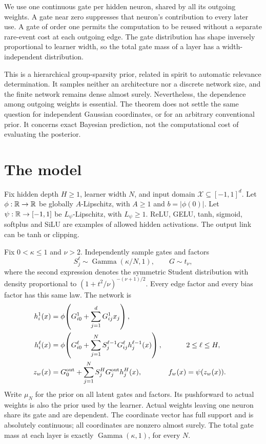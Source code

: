 \documentclass[11pt]{article}
\theoremstyle{remark}\newtheorem{remark}[theorem]{Remark}
\begin{document}
We use one continuous gate per hidden neuron, shared by all its outgoing weights. A gate near zero suppresses that neuron's contribution to every later use. A gate of order one permits the computation to be reused without a separate rare-event cost at each outgoing edge. The gate distribution has shape inversely proportional to learner width, so the total gate mass of a layer has a width-independent distribution.

This is a hierarchical group-sparsity prior, related in spirit to automatic relevance determination. It samples neither an architecture nor a discrete network size, and the finite network remains dense almost surely. Nevertheless, the dependence among outgoing weights is essential. The theorem does not settle the same question for independent Gaussian coordinates, or for an arbitrary conventional prior. It concerns exact Bayesian prediction, not the computational cost of evaluating the posterior.

\section{The model}
Fix hidden depth $H\ge1$, learner width $N$, and input domain
$\mathcal X\subseteq[-1,1]^d$. Let $\phi:\mathbb R\to\mathbb R$ be globally $A$-Lipschitz, with $A\ge1$ and $b=|\phi(0)|$. Let $\psi:\mathbb R\to[-1,1]$ be $L_\psi$-Lipschitz, with $L_\psi\ge1$. ReLU, GELU, tanh, sigmoid, softplus and SiLU are examples of allowed hidden activations. The output link can be tanh or clipping.

Fix $0<\kappa\le1$ and $\nu>2$. Independently sample gates and factors
\[
 S_j^\ell\sim\operatorname{Gamma}(\kappa/N,1),
 \qquad G\sim t_\nu,
\]
where the second expression denotes the symmetric Student distribution with density proportional to $(1+t^2/\nu)^{-(\nu+1)/2}$. Every edge factor and every bias factor has this same law. The network is
\begin{align}
 h_i^1(x)&=\phi\!\left(G^1_{i0}+\sum_{j=1}^dG^1_{ij}x_j\right),\\
 h_i^\ell(x)&=\phi\!\left(G^\ell_{i0}
       +\sum_{j=1}^N S_j^{\ell-1}G^\ell_{ij}h_j^{\ell-1}(x)\right),
       &&2\le\ell\le H,\\
 z_w(x)&=G^{\rm out}_0+\sum_{j=1}^NS_j^HG^{\rm out}_jh_j^H(x),
 &f_w(x)&=\psi(z_w(x)).
 \label{eq:model}
\end{align}
Write $\mu_N$ for the prior on all latent gates and factors. Its pushforward to actual weights is also the prior used by the learner. Actual weights leaving one neuron share its gate and are dependent. The coordinate vector has full support and is absolutely continuous; all coordinates are nonzero almost surely. The total gate mass at each layer is exactly $\operatorname{Gamma}(\kappa,1)$, for every $N$.
\end{document}
